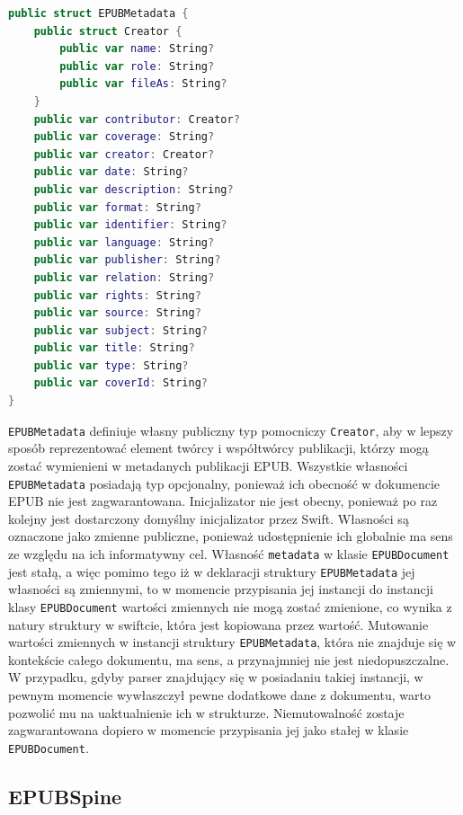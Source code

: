 \begin{lstlisting}[caption={Struktura EPUBMetadata}, language=swift,label=bbcdkcno]
public struct EPUBMetadata {
    public struct Creator {
        public var name: String?
        public var role: String?
        public var fileAs: String?
    }
    public var contributor: Creator?
    public var coverage: String?
    public var creator: Creator?
    public var date: String?
    public var description: String?
    public var format: String?
    public var identifier: String?
    public var language: String?
    public var publisher: String?
    public var relation: String?
    public var rights: String?
    public var source: String?
    public var subject: String?
    public var title: String?
    public var type: String?
    public var coverId: String?
}
\end{lstlisting}

\texttt{EPUBMetadata} definiuje własny publiczny typ pomocniczy \texttt{Creator}, aby w lepszy sposób reprezentować element twórcy i współtwórcy publikacji, którzy mogą zostać wymienieni w metadanych publikacji EPUB. Wszystkie własności \texttt{EPUBMetadata} posiadają typ opcjonalny, ponieważ ich obecność w dokumencie EPUB nie jest zagwarantowana. Inicjalizator nie jest obecny, ponieważ po raz kolejny jest dostarczony domyślny inicjalizator przez Swift. Własności są oznaczone jako zmienne publiczne, ponieważ udostępnienie ich globalnie ma sens ze względu na ich informatywny cel. Własność \texttt{metadata} w klasie \texttt{EPUBDocument} jest stałą, a więc pomimo tego iż w deklaracji struktury \texttt{EPUBMetadata} jej własności są zmiennymi, to w momencie przypisania jej instancji do instancji klasy \texttt{EPUBDocument} wartości zmiennych nie mogą zostać zmienione, co wynika z natury struktury w swiftcie, która jest kopiowana przez wartość. Mutowanie wartości zmiennych w instancji struktury \texttt{EPUBMetadata}, która nie znajduje się w kontekście całego dokumentu, ma sens, a przynajmniej nie jest niedopuszczalne. W przypadku, gdyby parser znajdujący się w posiadaniu takiej instancji, w pewnym momencie wywłaszczył pewne dodatkowe dane z dokumentu, warto pozwolić mu na uaktualnienie ich w strukturze. Niemutowalność zostaje zagwarantowana dopiero w momencie przypisania jej jako stałej w klasie \texttt{EPUBDocument}.

\subsection{EPUBSpine}


